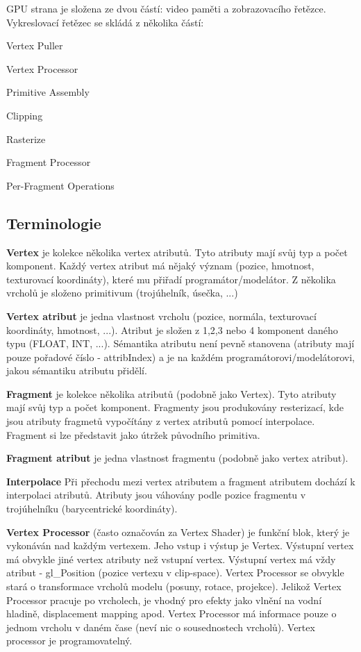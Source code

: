 G\-P\-U strana je složena ze dvou částí\-: video paměti a zobrazovacího řetězce. Vykreslovací řetězec se skládá z několika částí\-:
\begin{DoxyItemize}
\item Vertex Puller
\item Vertex Processor
\item Primitive Assembly
\item Clipping
\item Rasterize
\item Fragment Processor
\item Per-\/\-Fragment Operations
\end{DoxyItemize}\hypertarget{index_terminologie}{}\subsection{Terminologie}\label{index_terminologie}
{\bfseries Vertex} je kolekce několika vertex atributů. Tyto atributy mají svůj typ a počet komponent. Každý vertex atribut má nějaký význam (pozice, hmotnost, texturovací koordináty), které mu přiřadí programátor/modelátor. Z několika vrcholů je složeno primitivum (trojúhelník, úsečka, ...)

{\bfseries Vertex atribut} je jedna vlastnost vrcholu (pozice, normála, texturovací koordináty, hmotnost, ...). Atribut je složen z 1,2,3 nebo 4 komponent daného typu (F\-L\-O\-A\-T, I\-N\-T, ...). Sémantika atributu není pevně stanovena (atributy mají pouze pořadové číslo -\/ attrib\-Index) a je na každém programátorovi/modelátorovi, jakou sémantiku atributu přidělí. 

{\bfseries Fragment} je kolekce několika atributů (podobně jako Vertex). Tyto atributy mají svůj typ a počet komponent. Fragmenty jsou produkovány resterizací, kde jsou atributy fragmetů vypočítány z vertex atributů pomocí interpolace. Fragment si lze představit jako útržek původního primitiva.

{\bfseries Fragment atribut} je jedna vlastnost fragmentu (podobně jako vertex atribut).

{\bfseries Interpolace} Při přechodu mezi vertex atributem a fragment atributem dochází k interpolaci atributů. Atributy jsou váhovány podle pozice fragmentu v trojúhelníku (barycentrické koordináty). 

{\bfseries Vertex Processor} (často označován za Vertex Shader) je funkční blok, který je vykonáván nad každým vertexem. Jeho vstup i výstup je Vertex. Výstupní vertex má obvykle jiné vertex atributy než vstupní vertex. Výstupní vertex má vždy atribut -\/ gl\-\_\-\-Position (pozice vertexu v clip-\/space). Vertex Processor se obvykle stará o transformace vrcholů modelu (posuny, rotace, projekce). Jelikož Vertex Processor pracuje po vrcholech, je vhodný pro efekty jako vlnění na vodní hladině, displacement mapping apod. Vertex Processor má informace pouze o jednom vrcholu v daném čase (neví nic o sousednostech vrcholů). Vertex processor je programovatelný.

